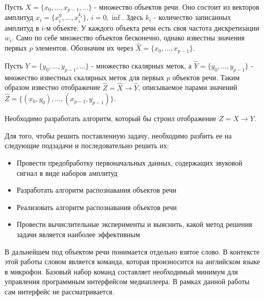 Пусть $X=\{x_0, ..., x_{p-1}, ...\}$ - множество объектов речи. Оно состоит из векторов амплитуд $x_i=\{x_i^0, ..., x_i^{k_i}\},~i=\overline{0,\inf}$. Здесь $k_i$ - количество записанных амплитуд в $i$-м объекте. У каждого объекта речи есть своя частота дискретизации $w_i$. Само по себе множество объектов бесконечно, однако известны значения первых $p$ элементов. Обозначим их через $\widehat{X}=\{x_0, ..., x_{p-1}\}$.  

Пусть $Y=\{y_0, ..., y_{p-1}, ...\}$ - множество скалярных меток, а $\widehat{Y}=\{y_0, ..., y_{p-1}\}$ - множество известных скалярных меток для первых $p$ объектов речи. Таким образом известно отображение $\widehat{Z}=\widehat{X} \rightarrow \widehat{Y}$, описываемое парами значений $\widehat{Z}=\{(x_0, y_0), ..., (x_{p-1}, y_{p-1})\}$.

Необходимо разработать алгоритм, который бы строил отображение $Z = X \rightarrow Y$.


Для того, чтобы решить поставленную задачу, необходимо разбить ее на следующие подзадачи и последовательно решить их:
\begin{itemize}[leftmargin=2cm]
\item Провести предобработку первоначальных данных, содержащих звуковой сигнал в виде наборов амплитуд
\item Разработать алгоритм распознавания объектов речи
\item Реализовать алгоритм распознавания объектов речи
\item Провести вычислительные эксперименты и выяснить, какой метод решения задачи является наиболее эффективным
\end{itemize}


В дальнейшем под объектом речи понимается отдельно взятое слово. В контексте этой работы словом является команда, которая произносится на английском языке в микрофон. Базовый набор команд составляет необходимый минимум для управления программным интерфейсом медиаплеера. В рамках данной работы сам интерфейс не рассматривается.